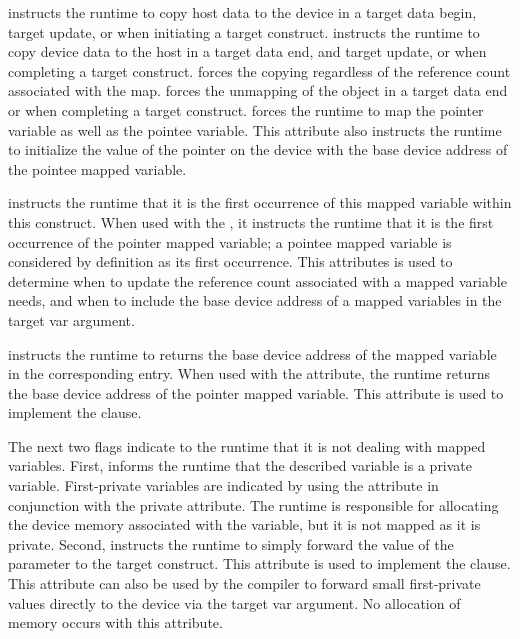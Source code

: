 \sloppy
{} instructs the runtime to copy  host data to the device in a target data begin, target update, or when initiating a target construct.   instructs the runtime to copy  device data to the host in a target data end, and target update, or when completing a target construct.   forces the copying regardless of the reference count associated with the map.    forces the unmapping of the object in a target data end or when completing a target construct.  forces the runtime to map the pointer variable as well as the pointee variable. This attribute also instructs the runtime to initialize the value of the pointer on the device with the base device address of the pointee mapped variable. 

 instructs the runtime that it is the first occurrence of this mapped variable within this construct.  When used with  the , it instructs the runtime that it is the first occurrence of the pointer mapped variable; a pointee mapped variable is considered by definition as its first occurrence. This attributes is used to determine when to update the reference count associated with a mapped variable needs, and when to include the base device address of a mapped variables in the target var argument. 

 instructs the runtime to returns the base device address of the mapped variable in the corresponding  entry. When used with  the  attribute, the runtime returns the base device address of the pointer mapped variable. This attribute is used to implement the  clause.

The next two flags indicate to the runtime that it is not dealing with mapped variables.  First,  informs the runtime that the described variable is a private variable. First-private variables are indicated by using the    attribute in conjunction with the private attribute. The runtime is responsible for allocating the device memory associated with the variable, but it is not mapped as it is private. Second,  instructs the runtime to simply forward the value of the  parameter to the target construct.  This attribute is used to implement the  clause. This attribute can also be used by the compiler to forward small first-private values directly to the device via the target var argument. No allocation of memory occurs with this attribute.

